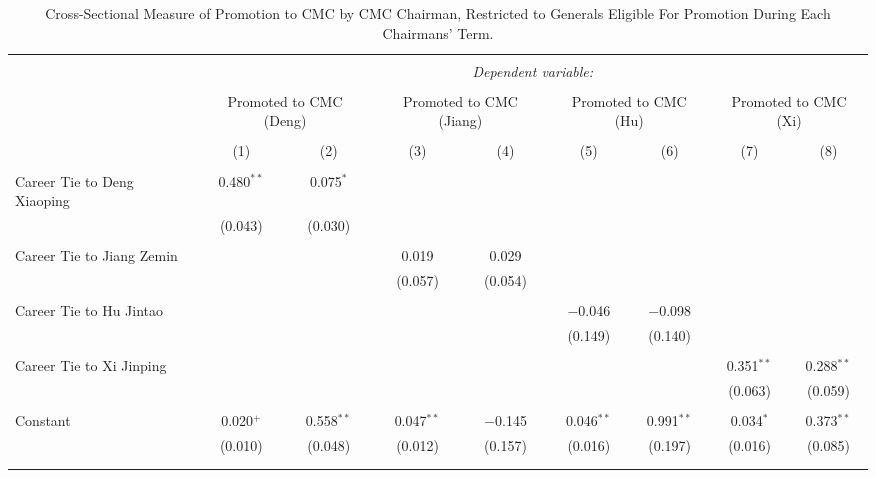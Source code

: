 \documentclass[12pt,letterpaper]{article}
\begin{document}
\begin{table}[!htbp] \centering 
	\caption{Cross-Sectional Measure of Promotion to CMC by CMC Chairman, Restricted to Generals Eligible For Promotion During Each Chairmans' Term.} 
	\label{table_a19} 
	\begin{tabular}{@{\extracolsep{5pt}}lcccccccc} 
		\\[-1.8ex]\hline 
		\hline \\[-1.8ex] 
		& \multicolumn{8}{c}{\textit{Dependent variable:}} \\ 
		\cline{2-9} 
		\\[-1.8ex] & \multicolumn{2}{c}{Promoted to CMC (Deng)} & \multicolumn{2}{c}{Promoted to CMC (Jiang)} & \multicolumn{2}{c}{Promoted to CMC (Hu)} & \multicolumn{2}{c}{Promoted to CMC (Xi)} \\ 
		\\[-1.8ex] & (1) & (2) & (3) & (4) & (5) & (6) & (7) & (8)\\ 
		\hline \\[-1.8ex] 
		Career Tie to Deng Xiaoping & 0.480$^{**}$ & 0.075$^{*}$ &  &  &  &  &  &  \\ 
		& (0.043) & (0.030) &  &  &  &  &  &  \\ 
		& & & & & & & & \\ 
		Career Tie to Jiang Zemin &  &  & 0.019 & 0.029 &  &  &  &  \\ 
		&  &  & (0.057) & (0.054) &  &  &  &  \\ 
		& & & & & & & & \\ 
		Career Tie to Hu Jintao &  &  &  &  & $-$0.046 & $-$0.098 &  &  \\ 
		&  &  &  &  & (0.149) & (0.140) &  &  \\ 
		& & & & & & & & \\ 
		Career Tie to Xi Jinping &  &  &  &  &  &  & 0.351$^{**}$ & 0.288$^{**}$ \\ 
		&  &  &  &  &  &  & (0.063) & (0.059) \\ 
		& & & & & & & & \\ 
		Constant & 0.020$^{+}$ & 0.558$^{**}$ & 0.047$^{**}$ & $-$0.145 & 0.046$^{**}$ & 0.991$^{**}$ & 0.034$^{*}$ & 0.373$^{**}$ \\ 
		& (0.010) & (0.048) & (0.012) & (0.157) & (0.016) & (0.197) & (0.016) & (0.085) \\ 
		& & & & & & & & \\ 
		\hline \\[-1.8ex] 

\end{tabular}
\end{table}
\end{document}
